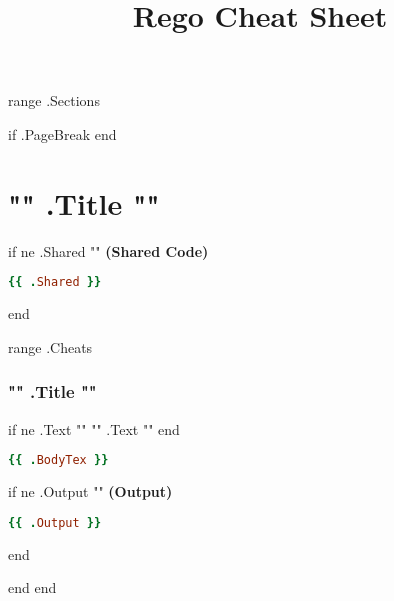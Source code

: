 \documentclass[twocolumn]{article}
\makeatletter
\renewcommand{\maketitle}{\bgroup\setlength{\parindent}{0pt}
\textbf{\LARGE{\@title}}
}
\makeatother
\begin{document}
\pagestyle{logo}
\title{Rego Cheat Sheet}

\maketitle
\vspace{-1em}

{{ range .Sections }}

{{ if .PageBreak }}
\newpage
{{ end}}

\section*{{ "{" }}{{ .Title }}  {{ "}" }}

{{ if ne .Shared "" }}
\textbf{\tiny{(Shared Code)}}
\begin{lstlisting}[language=Ruby]
{{ .Shared }}
\end{lstlisting}
{{ end }}

{{ range .Cheats }}
\vspace{-1em}
\subsubsection*{{ "{" }}{{ .Title }}{{ "}" }}

{{ if ne .Text "" }}
\footnotesize{{ "{" }}{{ .Text }}{{ "}" }}
{{ end }}

\begin{lstlisting}[language=Ruby]
{{ .BodyTex }}
\end{lstlisting}


{{ if ne .Output "" }}
\textbf{\tiny{(Output)}}
\begin{lstlisting}[language=Ruby]
{{ .Output }}
\end{lstlisting}
{{ end }}

{{ end }}
{{ end }}
\end{document}

